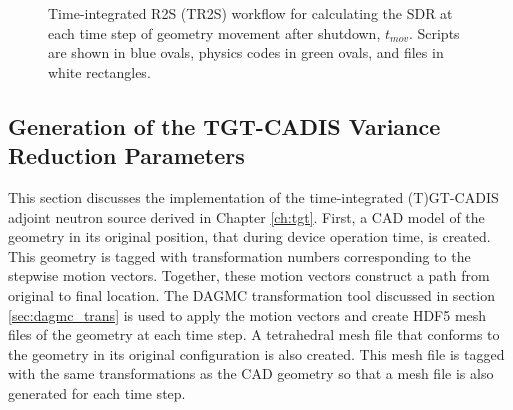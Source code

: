 \begin{figure}

	\caption[Time-integrated R2S (TR2S) workflow]
	{Time-integrated R2S (TR2S) workflow for calculating the SDR at each 
	time step of geometry movement after shutdown, $t_{mov}$.
	Scripts are shown in
	blue ovals, physics codes in green ovals, and files in white
	rectangles.\label{fig:tr2s_flow}}
\end{figure}

\subsection{Generation of the TGT-CADIS Variance Reduction Parameters}
This section discusses the implementation of the time-integrated (T)GT-CADIS 
adjoint neutron source derived in Chapter \ref{ch:tgt}.
First, a CAD model of the geometry in its original position, that during device
operation time, is created.  This geometry is tagged with transformation
numbers corresponding to the stepwise motion vectors.
Together, these motion vectors construct a path 
from original to final location.  The DAGMC
transformation tool discussed in section \ref{sec:dagmc_trans} is used to apply 
the motion vectors and create HDF5 mesh files of the geometry at each time step.   
A tetrahedral mesh file that conforms to the geometry in its original
configuration is also created.  This mesh file is tagged with the same
transformations as the CAD geometry so that a mesh file is also
generated for each time step. 

